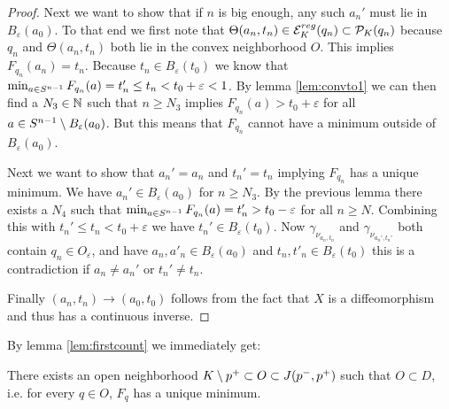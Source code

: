 \begin{proof}
    Next we want to show that if $n$ is big enough, any such $a_n'$ must lie in $B_\varepsilon(a_0)$. 
    To that end we first note that  $\Theta(a_n,t_n)\in {{\mathcal{E}}^{reg}_K}(q_n)\subset {\mathcal{P}}_K(q_n)$ because $q_n$ and $\Theta(a_n,t_n)$ both lie in the convex neighborhood $O$. 
    This implies $F_{q_n}(a_n)=t_n$. 
    Because $t_n\in B_\varepsilon(t_0)$ we know that $\min_{a\in {S^{n-1}}}F_{q_n}(a) = t'_n\leq t_n < t_0+\varepsilon < 1$. 
    By lemma \ref{lem:convto1} we can then find a $N_3\in \mathbb{N}$ such that $n\ge N_3$ implies $F_{q_n}(a)>t_0+\varepsilon$ for all $a\in {S^{n-1}} \setminus B_\varepsilon(a_0)$. But this means that $F_{q_n}$ cannot have a minimum outside of $B_\varepsilon(a_0)$.

    Next we want to show that $a_n'=a_n$ and $t_n'=t_n$ implying $F_{q_n}$ has a unique minimum.
    We have $a_n'\in B_\varepsilon(a_0)$ for $n\ge N_3$. By the previous lemma there exists a $N_4$ such that $\min_{a\in {S^{n-1}}} F_{q_n}(a)=t'_n> t_0-\varepsilon$ for all $n\ge N$. Combining this with $t_n'\leq t_n < t_0+\varepsilon$ we have $t_n'\in B_\varepsilon(t_0)$. Now $\gamma_{\nu_{a_n,t_n}}$ and $\gamma_{\nu_{a_n',t_n'}}$ both contain $q_n\in O_\varepsilon$, and have $a_n,a'_n\in B_\varepsilon(a_0)$ and $t_n,t'_n\in B_\varepsilon(t_0)$ this is a contradiction if $a_n\neq a_n'$ or $t_n'\neq t_n$. 

    Finally $(a_n,t_n)\to (a_0,t_0)$ follows from the fact that $X$ is a diffeomorphism and thus has a continuous inverse.
\end{proof}

By lemma \ref{lem:firstcount} we immediately get:
\begin{corollary}
    There exists an open neighborhood $K\setminus p^+\subset O\subset J(p^-,p^+)$ such that $O\subset D$, i.e. for every $q\in O$, $F_q$ has a unique minimum.
\end{corollary}

